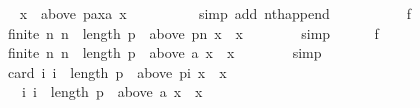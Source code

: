 \begin{isabellebody}
\ \ \ \ \ \ \isamarkupfalse%
\ {\isachardoublequoteopen}x\ {\isasymin}\ above\ {\isacharparenleft}{\kern0pt}{\isacharparenleft}{\kern0pt}p{\isacharat}{\kern0pt}{\isacharbrackleft}{\kern0pt}a{\isacharbrackright}{\kern0pt}{\isacharparenright}{\kern0pt}{\isacharbang}{\kern0pt}xa{\isacharparenright}{\kern0pt}\ x{\isachardoublequoteclose}\isanewline
\ \ \ \ \ \ \ \ \isamarkupfalse%
\ {\isacharparenleft}{\kern0pt}simp\ add{\isacharcolon}{\kern0pt}\ nth{\isacharunderscore}{\kern0pt}append{\isacharparenright}{\kern0pt}\isanewline
\ \ \ \ \isamarkupfalse%
\isanewline
\ \ \ \ \isamarkupfalse%
\ f{}{\isacharcolon}{\kern0pt}\isanewline
\ \ \ \ \ \ {\isachardoublequoteopen}finite\ {\isacharbraceleft}{\kern0pt}n{\isachardot}{\kern0pt}\ n\ {\isacharless}{\kern0pt}\ length\ p\ {\isasymand}\ {\isacharparenleft}{\kern0pt}above\ {\isacharparenleft}{\kern0pt}p{\isacharbang}{\kern0pt}n{\isacharparenright}{\kern0pt}\ x\ {\isacharequal}{\kern0pt}\ {\isacharbraceleft}{\kern0pt}x{\isacharbraceright}{\kern0pt}{\isacharparenright}{\kern0pt}{\isacharbraceright}{\kern0pt}{\isachardoublequoteclose}\isanewline
\ \ \ \ \ \ \isamarkupfalse%
\ simp\isanewline
\ \ \ \ \isamarkupfalse%
\ f{}{\isacharcolon}{\kern0pt}\isanewline
\ \ \ \ \ \ {\isachardoublequoteopen}finite\ {\isacharbraceleft}{\kern0pt}n{\isachardot}{\kern0pt}\ n\ {\isacharequal}{\kern0pt}\ length\ p\ {\isasymand}\ {\isacharparenleft}{\kern0pt}above\ {\isacharparenleft}{\kern0pt}{\isacharbrackleft}{\kern0pt}a{\isacharbrackright}{\kern0pt}{\isacharbang}{\kern0pt}{}{\isacharparenright}{\kern0pt}\ x\ {\isacharequal}{\kern0pt}\ {\isacharbraceleft}{\kern0pt}x{\isacharbraceright}{\kern0pt}{\isacharparenright}{\kern0pt}{\isacharbraceright}{\kern0pt}{\isachardoublequoteclose}\isanewline
\ \ \ \ \ \ \isamarkupfalse%
\ simp\isanewline
\ \ \ \ \isamarkupfalse%
\isanewline
\ \ \ \ \ \ {\isachardoublequoteopen}card\ {\isacharparenleft}{\kern0pt}{\isacharbraceleft}{\kern0pt}i{\isachardot}{\kern0pt}\ i\ {\isacharless}{\kern0pt}\ length\ p\ {\isasymand}\ {\isacharparenleft}{\kern0pt}above\ {\isacharparenleft}{\kern0pt}p{\isacharbang}{\kern0pt}i{\isacharparenright}{\kern0pt}\ x\ {\isacharequal}{\kern0pt}\ {\isacharbraceleft}{\kern0pt}x{\isacharbraceright}{\kern0pt}{\isacharparenright}{\kern0pt}{\isacharbraceright}{\kern0pt}\ {\isasymunion}\isanewline
\ \ \ \ \ \ \ \ {\isacharbraceleft}{\kern0pt}i{\isachardot}{\kern0pt}\ i\ {\isacharequal}{\kern0pt}\ length\ p\ {\isasymand}\ {\isacharparenleft}{\kern0pt}above\ {\isacharparenleft}{\kern0pt}{\isacharbrackleft}{\kern0pt}a{\isacharbrackright}{\kern0pt}{\isacharbang}{\kern0pt}{}{\isacharparenright}{\kern0pt}\ x\ {\isacharequal}{\kern0pt}\ {\isacharbraceleft}{\kern0pt}x{\isacharbraceright}{\kern0pt}{\isacharparenright}{\kern0pt}{\isacharbraceright}{\kern0pt}{\isacharparenright}{\kern0pt}\ {\isacharequal}{\kern0pt}\isanewline

\end{isabellebody}
